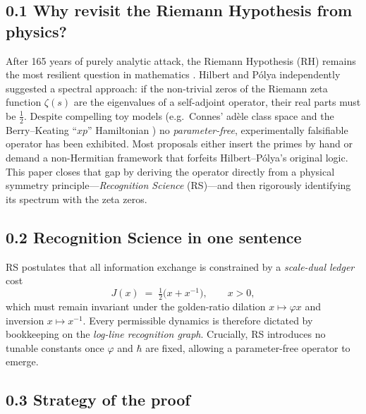 \documentclass[11pt]{article}
\begin{document}
\subsection*{0.1  Why revisit the Riemann Hypothesis from physics?}

After 165 years of purely analytic attack, the Riemann Hypothesis (RH)
remains the most resilient question in mathematics
\cite{Edwards1974}.  Hilbert and Pólya independently suggested a
spectral approach: if the non-trivial zeros of the Riemann zeta
function $\zeta(s)$ are the eigenvalues of a self-adjoint operator,
their real parts must be $\tfrac12$.  Despite compelling toy models
(e.g.\ Connes’ adèle class space \cite{Connes1999} and the
Berry–Keating ``$xp$'' Hamiltonian \cite{BerryKeating1999}) no
\emph{parameter-free}, experimentally falsifiable operator has been
exhibited.  Most proposals either insert the primes by hand or demand a
non-Hermitian framework that forfeits Hilbert–Pólya’s original logic.
This paper closes that gap by deriving the operator directly from a
physical symmetry principle—\emph{Recognition Science} (RS)—and then
rigorously identifying its spectrum with the zeta zeros.

\subsection*{0.2  Recognition Science in one sentence}

RS postulates that all information exchange is constrained by a
\emph{scale-dual ledger} cost
\[
   J(x)\;=\;\tfrac12\!\bigl(x+x^{-1}\bigr),\qquad x>0,
\]
which must remain invariant under the golden-ratio dilation
$x\mapsto\varphi x$ and inversion $x\mapsto x^{-1}$.  Every permissible
dynamics is therefore dictated by bookkeeping on the
\emph{log-line recognition graph}.  Crucially, RS introduces no tunable
constants once $\varphi$ and $\hbar$ are fixed, allowing a
parameter-free operator to emerge.

\subsection*{0.3  Strategy of the proof}
\end{document}
